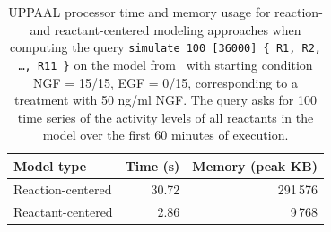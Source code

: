 \documentclass{llncs}
\begin{document}
\begin{table}
  \begin{center}
  \begin{tabular}{|l||r|r|}
    \hline
    Model type & Time (s) & Memory (peak KB) \\
    \hline
    \hline
    Reaction-centered & 30.72 & 291\,{}576 \\ %
    \hline
    Reactant-centered & 2.86 & 9\,{}768 \\ %
    \hline
  \end{tabular}
  \end{center}
  \caption{UPPAAL processor time and memory usage for reaction- and reactant-centered modeling approaches when computing
  the query {\tt simulate 100 [36000] \{ R1, R2, \dots, R11 \}} on the model from~\cite{animo-ieee} with starting condition
  NGF = 15/15, EGF = 0/15, corresponding to a treatment with 50 ng/ml NGF.
  The query asks for 100 time series of the activity levels of all reactants in the model over the first 60 minutes
  of execution.\label{tab:sim-100}}
\end{table}
\end{document}
